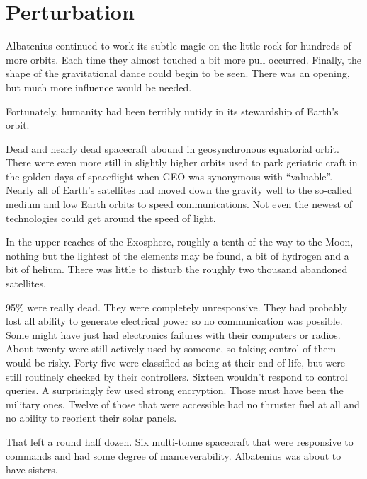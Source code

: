 %
%

\chapter{Perturbation}

Albatenius continued to work its subtle magic on the little rock for hundreds of more orbits. Each time they almost touched a bit more pull occurred. Finally, the shape of the gravitational dance could begin to be seen. There was an opening, but much more influence would be needed.

Fortunately, humanity had been terribly untidy in its stewardship of Earth's orbit.

Dead and nearly dead spacecraft abound in geosynchronous equatorial orbit. There were even more still in slightly higher orbits used to park geriatric craft in the golden days of spaceflight when GEO was synonymous with ``valuable''. Nearly all of Earth's satellites had moved down the gravity well to the so-called medium and low Earth orbits to speed communications. Not even the newest of technologies could get around the speed of light.

In the upper reaches of the Exosphere, roughly a tenth of the way to the Moon, nothing but the lightest of the elements may be found, a bit of hydrogen and a bit of helium. There was little to disturb the roughly two thousand abandoned satellites.

95\% were really dead. They were completely unresponsive. They had probably lost all ability to generate electrical power so no communication was possible. Some might have just had electronics failures with their computers or radios. About twenty were still actively used by someone, so taking control of them would be risky. Forty five were classified as being at their end of life, but were still routinely checked by their controllers. Sixteen wouldn't respond to control queries. A surprisingly few used strong encryption. Those must have been the military ones. Twelve of those that were accessible had no thruster fuel at all and no ability to reorient their solar panels.

That left a round half dozen. Six multi-tonne spacecraft that were responsive to commands and had some degree of manueverability. Albatenius was about to have sisters.


